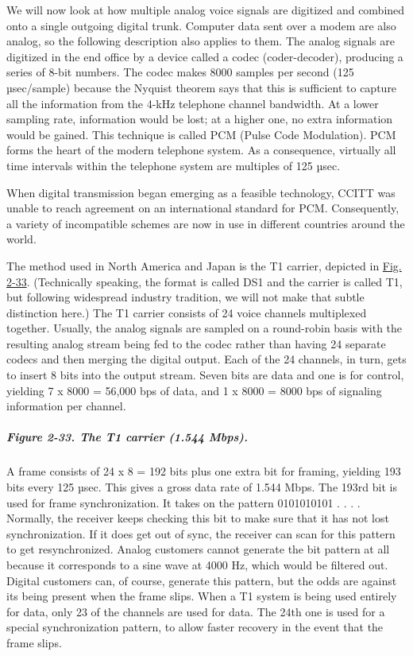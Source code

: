 \documentclass[b5paper,11pt]{memoir}
\begin{document}
We will now look at how multiple analog voice signals are digitized and
combined onto a single outgoing digital trunk. Computer data sent over a
modem are also analog, so the following description also applies to
them. The analog signals are digitized in the end office by a device
called a {codec} (coder-decoder), producing a series of 8-bit numbers.
The codec makes 8000 samples per second (125 µsec/sample) because the
Nyquist theorem says that this is sufficient to capture all the
information from the 4-kHz telephone channel bandwidth. At a lower
sampling rate, information would be lost; at a higher one, no extra
information would be gained. This technique is called {PCM} ({Pulse Code
Modulation}). PCM forms the heart of the modern telephone system. As a
consequence, virtually all time intervals within the telephone system
are multiples of 125 µsec.

When digital transmission began emerging as a feasible technology, CCITT
was unable to reach agreement on an international standard for PCM.
Consequently, a variety of incompatible schemes are now in use in
different countries around the world.

The method used in North America and Japan is the {T1} carrier, depicted
in
\protect\hyperlink{0130661023_ch02lev1sec5.htmlux5cux23ch02fig33}{Fig.
2-33}. (Technically speaking, the format is called DS1 and the carrier
is called T1, but following widespread industry tradition, we will not
make that subtle distinction here.) The T1 carrier consists of 24 voice
channels multiplexed together. Usually, the analog signals are sampled
on a round-robin basis with the resulting analog stream being fed to the
codec rather than having 24 separate codecs and then merging the digital
output. Each of the 24 channels, in turn, gets to insert 8 bits into the
output stream. Seven bits are data and one is for control, yielding 7 x
8000 = 56,000 bps of data, and 1 x 8000 = 8000 bps of signaling
information per channel.

\subparagraph[Figure 2-33. The T1 carrier (1.544
Mbps).]{\texorpdfstring{\protect\hypertarget{0130661023_ch02lev1sec5.htmlux5cux23ch02fig33}{}{}Figure
2-33. The T1 carrier (1.544
Mbps).}{Figure 2-33. The T1 carrier (1.544 Mbps).}}


A frame consists of 24 x 8 = 192 bits plus one extra bit for framing,
yielding 193 bits every 125 µsec{.} This gives a gross data rate of
1.544 Mbps. The 193rd bit is used for frame synchronization. It takes on
the pattern 0101010101 . . . . Normally, the receiver keeps checking
this bit to make sure that it has not lost synchronization. If it does
get out of sync, the receiver can scan for this pattern to get
resynchronized. Analog customers cannot generate the bit pattern at all
because it corresponds to a sine wave at 4000 Hz, which would be
filtered out. Digital customers can, of course, generate this pattern,
but the odds are against its being present when the frame slips. When a
T1 system is being used entirely for data, only 23 of the channels are
used for data. The 24th one is used for a special synchronization
pattern, to allow faster recovery in the event that the frame slips.
\end{document}
